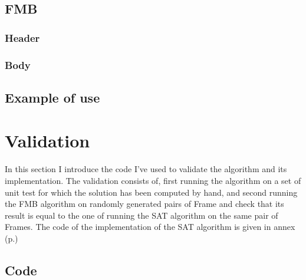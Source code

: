 \documentclass[12pt, a4paper]{article}
\begin{document}
\subsection{FMB}

\subsubsection{Header}

\begin{scriptsize}
\begin{ttfamily}

\end{ttfamily}
\end{scriptsize}

\subsubsection{Body}

\begin{scriptsize}
\begin{ttfamily}

\end{ttfamily}
\end{scriptsize}

\subsection{Example of use}

\begin{scriptsize}
\begin{ttfamily}

\end{ttfamily}
\end{scriptsize}

\section{Validation}

In this section I introduce the code I've used to validate the algorithm and its implementation. The validation consists of, first running the algorithm on a set of unit test for which the solution has been computed by hand, and second running the FMB algorithm on randomly generated pairs of Frame and check that its result is equal to the one of running the SAT algorithm on the same pair of Frames. The code of the implementation of the SAT algorithm is given in annex (p.\pageref{sat_implementation})\\

\subsection{Code}
\end{document}
